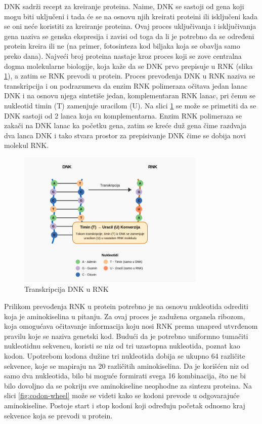 \documentclass[12pt,oneside]{memoir}
\begin{document}
DNK sadrži recept za kreiranje proteina. Naime, DNK se sastoji od gena koji mogu biti uključeni i tada će se na osnovu njih kreirati proteini ili isključeni kada se oni neće koristiti za kreiranje proteina. Ovaj proces uključivanja i isključivanja gena naziva se genska ekspresija i zavisi od toga da li je potrebno da se određeni protein kreira ili ne (na primer, fotosinteza kod biljaka koja se obavlja samo preko dana).
Najveći broj proteina nastaje kroz proces koji se zove centralna dogma molekularne biologije, koja kaže da se DNK prvo prepisuje u RNK (slika \ref{fig:transkripcija}), a zatim se RNK prevodi u protein. Proces prevođenja DNK u RNK naziva se transkripcija i on podrazumeva da enzim RNK polimeraza očitava jedan lanac DNK i na osnovu njega sintetiše jedan, komplementaran RNK lanac, pri čemu se nukleotid timin (T) zamenjuje uracilom (U). Na slici \ref{fig:transkripcija} se može se primetiti da se DNK sastoji od 2 lanca koja su komplementarna. Enzim RNK polimeraza se zakači na DNK lanac ka početku gena, zatim se kreće duž gena čime razdvaja dva lanca DNK i tako stvara prostor za prepisivanje DNK čime se dobija novi molekul RNK.

\begin{figure}[h]
  \centering
  \includegraphics[width=0.8\textwidth]{images/dna_rna_transcription_diagram.png}
  \caption{Transkripcija DNK u RNK}
  \label{fig:transkripcija}
\end{figure}

Prilikom prevođenja RNK u protein potrebno je na osnovu nukleotida odrediti koja je aminokiselina u pitanju. Za ovaj proces je zadužena organela ribozom, koja omogućava očitavanje informacija koju nosi RNK prema unapred utvrđenom pravilu koje se naziva genetski kod. Budući da je potrebno uniformno tumačiti nukleotidnu sekvencu, koristi se niz od tri uzastopna nukleotida, poznat kao kodon. Upotrebom kodona dužine tri nukleotida dobija se ukupno 64 različite sekvence, koje se mapiraju na 20 različitih aminokiselina. Da je korišćen niz od samo dva nukleotida, bilo bi moguće formirati svega 16 kombinacija, što ne bi bilo dovoljno da se pokriju sve aminokiseline neophodne za sintezu proteina. Na slici \ref{fig:codon-wheel} može se videti kako se kodoni prevode u odgovarajuće aminokiseline. Postoje start i stop kodoni koji određuju početak odnosno kraj sekvence koja se prevodi u protein.
\end{document}
